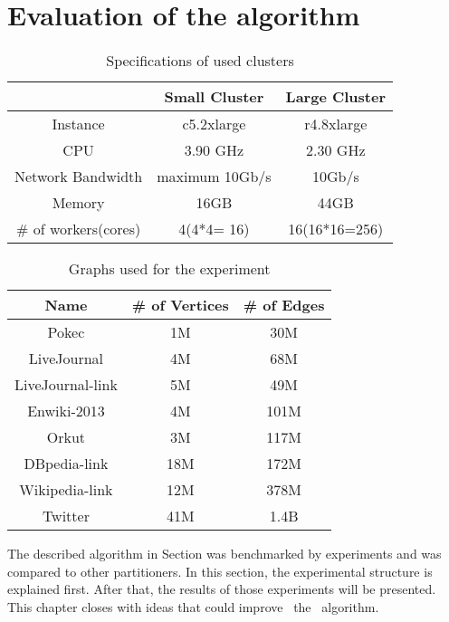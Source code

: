 \documentclass[acmsmall,nonacm,screen,review]{acmart}
\begin{document}
\section{Evaluation of the algorithm}
\begin{table}[bt!]
    \centering
    \begin{tabular}{ccc}
    \hline
     & Small Cluster & Large Cluster \\
    \hline
     Instance & c5.2xlarge & r4.8xlarge\\
     CPU & 3.90 GHz & 2.30 GHz\\
     Network Bandwidth & maximum 10Gb/s & 10Gb/s\\
    Memory  & 16GB & 44GB\\
     \# of workers(cores) & 4(4*4= 16) & 16(16*16=256)\\
     \hline
    \end{tabular}
    \caption{Specifications of used clusters}
    \label{clusters}
\end{table}
\begin{table}[bt!]
    \centering
    \begin{tabular}{ccc}
    \hline
    Name & \# of Vertices & \# of Edges \\
    \hline
     Pokec & 1M & 30M\\
     LiveJournal & 4M & 68M\\
     LiveJournal-link & 5M & 49M \\
     Enwiki-2013 & 4M & 101M \\
     Orkut & 3M & 117M\\
     DBpedia-link & 18M & 172M \\
     Wikipedia-link & 12M & 378M\\
     Twitter & 41M & 1.4B\\
     \hline
    \end{tabular}
    \caption{Graphs used for the experiment}
    \label{graphs}
\end{table}
The described algorithm in Section  was benchmarked by experiments and was compared to other partitioners. In this section, the experimental structure is explained first. After that, the results of those experiments will be presented. This chapter closes with ideas that could improve ~the ~algorithm.
\end{document}
